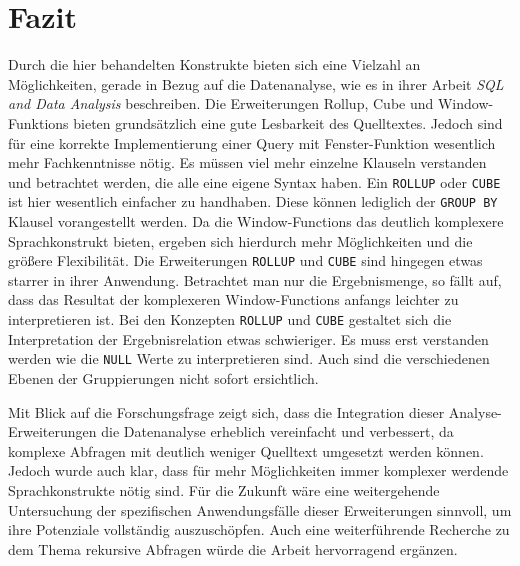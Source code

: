 \chapter{Fazit}
\label{chap:fazit} Durch die hier behandelten Konstrukte bieten sich eine Vielzahl
an Möglichkeiten, gerade in Bezug auf die Datenanalyse, wie es \citet{FOTACHE2015243}
in ihrer Arbeit \textit{SQL and Data Analysis} beschreiben. Die Erweiterungen
Rollup, Cube und Window-Funktions bieten grundsätzlich eine gute Lesbarkeit des Quelltextes.
Jedoch sind für eine korrekte Implementierung einer Query mit Fenster-Funktion
wesentlich mehr Fachkenntnisse nötig. Es müssen viel mehr einzelne Klauseln verstanden
und betrachtet werden, die alle eine eigene Syntax haben. Ein \texttt{ROLLUP}
oder \texttt{CUBE} ist hier wesentlich einfacher zu handhaben. Diese können
lediglich der \texttt{GROUP BY} Klausel vorangestellt werden. Da die Window-Functions
das deutlich komplexere Sprachkonstrukt bieten, ergeben sich hierdurch mehr Möglichkeiten
und die größere Flexibilität. Die Erweiterungen \texttt{ROLLUP} und \texttt{CUBE}
sind hingegen etwas starrer in ihrer Anwendung. Betrachtet man nur die Ergebnismenge,
so fällt auf, dass das Resultat der komplexeren Window-Functions anfangs leichter
zu interpretieren ist. Bei den Konzepten \texttt{ROLLUP} und \texttt{CUBE}
gestaltet sich die Interpretation der Ergebnisrelation etwas schwieriger. Es muss
erst verstanden werden wie die \texttt{NULL} Werte zu interpretieren sind. Auch sind
die verschiedenen Ebenen der Gruppierungen nicht sofort ersichtlich.

Mit Blick auf die Forschungsfrage zeigt sich, dass die Integration dieser
Analyse-Erweiterungen die Datenanalyse erheblich vereinfacht und verbessert, da komplexe
Abfragen mit deutlich weniger Quelltext umgesetzt werden können. Jedoch wurde
auch klar, dass für mehr Möglichkeiten immer komplexer werdende Sprachkonstrukte
nötig sind. Für die Zukunft wäre eine weitergehende Untersuchung der
spezifischen Anwendungsfälle dieser Erweiterungen sinnvoll, um ihre Potenziale vollständig
auszuschöpfen. Auch eine weiterführende Recherche zu dem Thema rekursive
Abfragen würde die Arbeit hervorragend ergänzen.